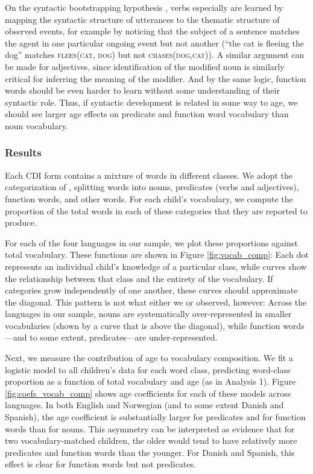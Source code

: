 \documentclass[10pt,letterpaper]{article}
\begin{document}
On the syntactic bootstrapping hypothesis \cite{gleitman1990,fisher2010}, verbs especially are learned by mapping the syntactic structure of utterances to the thematic structure of observed events, for example by noticing that the subject of a sentence matches the agent in one particular ongoing event but not another (``the cat is fleeing the dog'' matches \textsc{flees(cat, dog)} but not \textsc{chases(dog,cat)}). A similar argument can be made for adjectives, since identification of the modified noun is similarly critical for inferring the meaning of the modifier. And by the same logic, function words should be even harder to learn without some understanding of their syntactic role.   Thus, if syntactic development is related in some way to age, we should see larger age effects on predicate and function word vocabulary than noun vocabulary. 

\vfill

\subsubsection{Results}

Each CDI form contains a mixture of words in different classes. We adopt the categorization of , splitting words into nouns, predicates (verbs and adjectives), function words, and other words. For each child's vocabulary, we compute the proportion of the total words in each of these categories that they are reported to produce.

For each of the four languages in our sample, we plot these proportions against total vocabulary. These functions are shown in Figure \ref{fig:vocab_comp}: Each dot represents an individual child's knowledge of a particular class, while curves show the relationship between that class and the entirety of the vocabulary. If categories grow independently of one another, these curves should approximate the diagonal. This pattern is not what either we or \citeauthor{bates1994} observed, however: Across the languages in our sample, nouns are systematically over-represented in smaller vocabularies (shown by a curve that is above the diagonal), while function words---and to some extent, predicates---are under-represented. 

Next, we measure the contribution of age to vocabulary composition. We fit a logistic model to all children's data for each word class, predicting word-class proportion as a function of total vocabulary and age (as in Analysis 1). Figure \ref{fig:coefs_vocab_comp} shows age coefficients for each of these models across languages. In both English and Norwegian (and to some extent Danish and Spanish), the age coefficient is substantially larger for predicates and for function words than for nouns. This asymmetry can be interpreted as evidence that for two vocabulary-matched children, the older would tend to have relatively more predicates and function words than the younger. For Danish and Spanish, this effect is clear for function words but not predicates.
\end{document}

